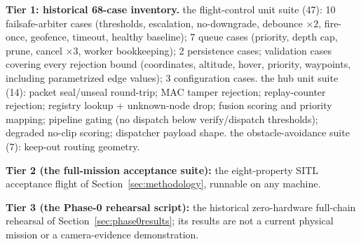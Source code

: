 \documentclass[12pt,a4paper]{report}
\begin{document}
\textbf{Tier 1: historical 68-case inventory.}
the flight-control unit suite (47): 10 failsafe-arbiter cases
(thresholds, escalation, no-downgrade, debounce $\times 2$, fire-once,
geofence, timeout, healthy baseline); 7 queue cases (priority, depth
cap, prune, cancel $\times 3$, worker bookkeeping); 2 persistence
cases; validation cases covering every rejection bound (coordinates,
altitude, hover, priority, waypoints, including parametrized edge
values); 3 configuration cases.
the hub unit suite (14): packet seal/unseal round-trip; MAC
tamper rejection; replay-counter rejection; registry lookup +
unknown-node drop; fusion scoring and priority mapping; pipeline
gating (no dispatch below verify/dispatch thresholds); degraded
no-clip scoring; dispatcher payload shape.
the obstacle-avoidance suite (7): keep-out routing
geometry.

\textbf{Tier 2 (the full-mission acceptance suite):} the
eight-property SITL acceptance flight of Section~\ref{sec:methodology},
runnable on any machine.

\textbf{Tier 3 (the Phase-0 rehearsal script):} the
historical zero-hardware full-chain rehearsal of
Section~\ref{sec:phase0results}; its results are not a current physical
mission or a camera-evidence demonstration.
\end{document}
